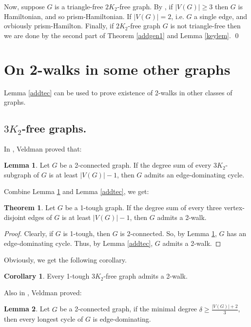 \documentclass{amsart}
\theoremstyle{definition}
\newtheorem{theorem}{Theorem}
\newtheorem{corollary}{Corollary}
\newtheorem{lemma}{Lemma}
\begin{document}
Now, suppose $G$ is a triangle-free $2K_2$-free graph. By \cite[Theorem 4]{broersma2014toughness},
if $|V(G)|\geq 3$ then 
$G$ is Hamiltonian, and so prism-Hamiltonian.
If $|V(G)|=2$, i.e. $G$ a single edge, and ovbiously prism-Hamilton.
Finally, if $2K_2$-free graph $G$ is not triangle-free then we are done by 
the second part of Theorem \ref{addgen1} and Lemma \ref{keylem}.
\qed

\iffalse
\section{On 2-walks in some other graphs}
Lemma \ref{addtec} can be used to prove existence of 2-walks in other classes of graphs.
\subsection{$3K_2$-free graphs.}
In \cite{veldman83}, Veldman proved that:
\begin{lemma}\label{gen3k2de}{\cite[Corollary 3.2]{veldman83}}
Let $G$ be a 2-connected graph. If the degree sum of every $3K_2$-subgraph 
of $G$ is at least $|V(G)|-1$, then $G$ admits an edge-dominating cycle.
\end{lemma}

Combine Lemma \ref{gen3k2de} and Lemma \ref{addtec}, we get:

\begin{theorem}\label{2w3k2f}
Let $G$ be a 1-tough graph. If the degree sum of every three vertex-disjoint edges of $G$ is at least $|V(G)|-1$, then $G$ admits a 2-walk.
\end{theorem}

\begin{proof}
Clearly, if $G$ is 1-tough, then $G$ is 2-connected. So, by Lemma \ref{gen3k2de}, $G$ has an edge-dominating cycle. Thus, by Lemma \ref{addtec}, $G$ admits a 2-walk.
\end{proof}

Obviously, we get the following corollary.
\begin{corollary}
Every 1-tough $3K_2$-free graph admits a 2-walk.
\end{corollary}

Also in \cite{veldman83}, Veldman proved:

\begin{lemma}\label{lemdelta}{\cite[Theorem C]{veldman83}}
Let $G$ be a 2-connected graph, if the minimal degree $\delta\ge\frac{|V(G)|+2}{3}$, then every longest cycle of $G$ is edge-dominating.
\end{lemma}
\end{document}
